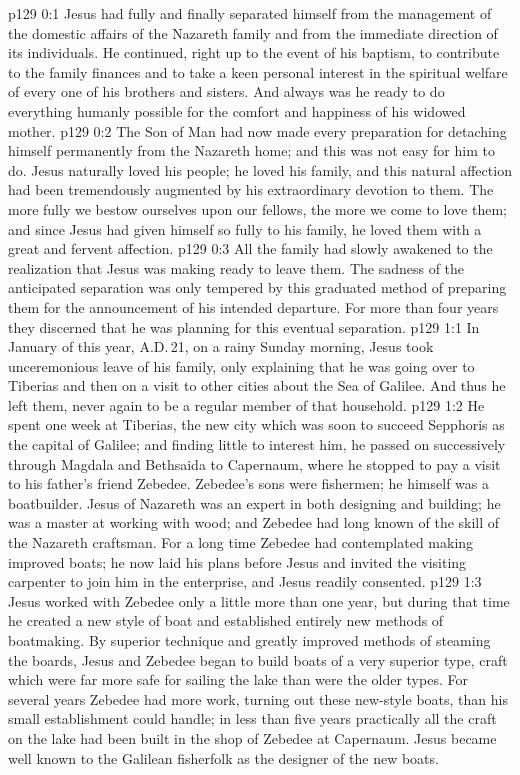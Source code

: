 \author{Midwayer Commission}
\vs p129 0:1 Jesus had fully and finally separated himself from the management of the domestic affairs of the Nazareth family and from the immediate direction of its individuals. He continued, right up to the event of his baptism, to contribute to the family finances and to take a keen personal interest in the spiritual welfare of every one of his brothers and sisters. And always was he ready to do everything humanly possible for the comfort and happiness of his widowed mother.
\vs p129 0:2 The Son of Man had now made every preparation for detaching himself permanently from the Nazareth home; and this was not easy for him to do. Jesus naturally loved his people; he loved his family, and this natural affection had been tremendously augmented by his extraordinary devotion to them. The more fully we bestow ourselves upon our fellows, the more we come to love them; and since Jesus had given himself so fully to his family, he loved them with a great and fervent affection.
\vs p129 0:3 All the family had slowly awakened to the realization that Jesus was making ready to leave them. The sadness of the anticipated separation was only tempered by this graduated method of preparing them for the announcement of his intended departure. For more than four years they discerned that he was planning for this eventual separation.
\vs p129 1:1 In January of this year, A.D.\,21, on a rainy Sunday morning, Jesus took unceremonious leave of his family, only explaining that he was going over to Tiberias and then on a visit to other cities about the Sea of Galilee. And thus he left them, never again to be a regular member of that household.
\vs p129 1:2 He spent one week at Tiberias, the new city which was soon to succeed Sepphoris as the capital of Galilee; and finding little to interest him, he passed on successively through Magdala and Bethsaida to Capernaum, where he stopped to pay a visit to his father’s friend Zebedee. Zebedee’s sons were fishermen; he himself was a boatbuilder. Jesus of Nazareth was an expert in both designing and building; he was a master at working with wood; and Zebedee had long known of the skill of the Nazareth craftsman. For a long time Zebedee had contemplated making improved boats; he now laid his plans before Jesus and invited the visiting carpenter to join him in the enterprise, and Jesus readily consented.
\vs p129 1:3 Jesus worked with Zebedee only a little more than one year, but during that time he created a new style of boat and established entirely new methods of boatmaking. By superior technique and greatly improved methods of steaming the boards, Jesus and Zebedee began to build boats of a very superior type, craft which were far more safe for sailing the lake than were the older types. For several years Zebedee had more work, turning out these new\hyp{}style boats, than his small establishment could handle; in less than five years practically all the craft on the lake had been built in the shop of Zebedee at Capernaum. Jesus became well known to the Galilean fisherfolk as the designer of the new boats.
